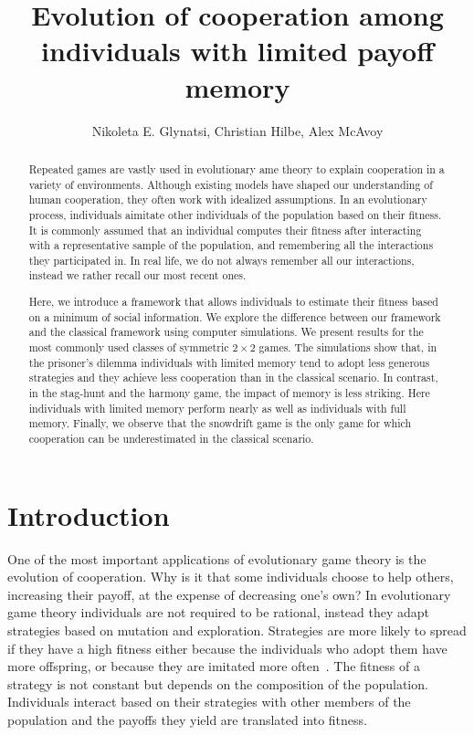 \documentclass[11pt]{article}
\title{
\bf  \sffamily \LARGE Evolution of cooperation among individuals with limited payoff memory\\}
\date{}
\author{Nikoleta E. Glynatsi, Christian Hilbe, Alex McAvoy}
\theoremstyle{plainCl1}
\theoremstyle{plainCl2}
\begin{document}
\maketitle

\begin{abstract}
Repeated games are vastly used in evolutionary ame theory to explain cooperation in a variety of environments. Although existing models have shaped our understanding of human cooperation, they often work with idealized
assumptions. In an evolutionary process, individuals aimitate other individuals
of the population based on their fitness. It is commonly assumed that an
individual computes their fitness after interacting with a representative sample
of the population, and remembering all the interactions they participated in. In
real life, we do not always remember all our interactions, instead we rather
recall our most recent ones.

Here, we introduce a framework that allows individuals to estimate their fitness
based on a minimum of social information. We explore the difference between our
framework and the classical framework using computer simulations. We present results for
the most commonly used classes of symmetric \(2 \times 2\) games. The
simulations show that, in the prisoner's dilemma individuals with limited memory
tend to adopt less generous strategies and they achieve less cooperation than in
the classical scenario. In contrast, in the stag-hunt and the harmony game, the
impact of memory is less striking. Here individuals with limited memory perform
nearly as well as individuals with full memory. Finally, we observe that the
snowdrift game is the only game for which cooperation can be underestimated in
the classical scenario.
\end{abstract}

\section{Introduction}

One of the most important applications of evolutionary game theory is the
evolution of cooperation. Why is it that some individuals choose to help others,
increasing their payoff, at the expense of decreasing one's own? In evolutionary
game theory individuals are not required to be rational, instead they adapt
strategies based on mutation and exploration. Strategies are more likely to
spread if they have a high fitness either because the individuals who adopt them
have more offspring, or because they are imitated more often~\cite{Wu2015}. The
fitness of a strategy is not constant but depends on the composition of the
population. Individuals interact based on their strategies with other members of
the population and the payoffs they yield are translated into fitness.
\end{document}
